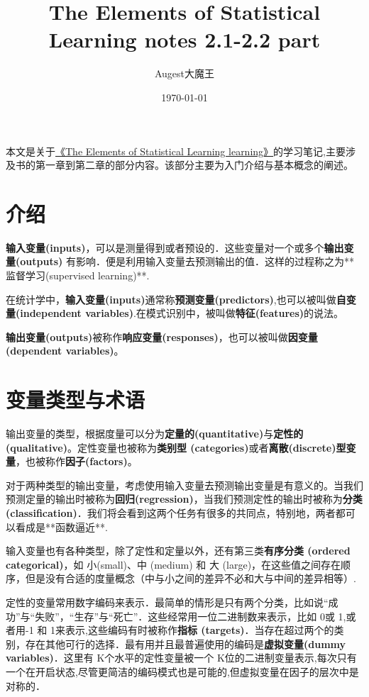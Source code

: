 \documentclass[UTF8]{ctexart}
\title{The Elements of Statistical Learning notes 2.1-2.2 part}
\author{Augest大魔王}
\date{\today}
\begin{document}
  
	\maketitle
	
	本文是关于\href{https://github.com/dr-jiahaoCHEN/Mathematics-and-Statistics/blob/main/book%26notes/The%20Elements%20of%20Statistical%20Learning/(Springer%20Series%20in%20Statistics)%20Trevor%20Hastie%2C%20%20Robert%20Tibshirani%2C%20Jerome%20Friedman%20-%20The%20Elements%20of%20%20Statistical%20Learning_%20%20Data%20Mining%2C%20Inference%2C%20and%20Prediction.-Springer%20(2013).pdf}{《The Elements of Statistical Learning learning》}的学习笔记,主要涉及书的第一章到第二章的部分内容。该部分主要为入门介绍与基本概念的阐述。
	
	\section{介绍}
	\textbf{输入变量(inputs)}，可以是测量得到或者预设的．这些变量对一个或多个\textbf{输出变量(outputs)} 有影响．便是利用输入变量去预测输出的值．这样的过程称之为**监督学习(supervised learning)**.
	
	在统计学中，\textbf{输入变量(inputs)}通常称\textbf{预测变量(predictors)},也可以被叫做\textbf{自变量(independent variables)}.在模式识别中，被叫做\textbf{特征(features)}的说法。
	
	\textbf{输出变量(outputs)}被称作\textbf{响应变量(responses)}，也可以被叫做\textbf{因变量(dependent variables)}。
	
	
	\section{变量类型与术语}
	输出变量的类型，根据度量可以分为\textbf{定量的(quantitative)}与\textbf{定性的(qualitative)}。定性变量也被称为\textbf{类别型 (categories)}或者\textbf{离散(discrete)型变量}，也被称作\textbf{因子(factors)}。
	
	对于两种类型的输出变量，考虑使用输入变量去预测输出变量是有意义的。当我们预测定量的输出时被称为\textbf{回归(regression)}，当我们预测定性的输出时被称为\textbf{分类(classification)}．我们将会看到这两个任务有很多的共同点，特别地，两者都可以看成是**函数逼近**.
	
	输入变量也有各种类型，除了定性和定量以外，还有第三类\textbf{有序分类 (ordered categorical)}，如 小(small)、中 (medium) 和 大 (large)，在这些值之间存在顺序，但是没有合适的度量概念（中与小之间的差异不必和大与中间的差异相等）.
	
	定性的变量常用数字编码来表示．最简单的情形是只有两个分类，比如说“成功”与“失败”，“生存”与“死亡”．这些经常用一位二进制数来表示，比如 0或 1,或者用-1 和 1来表示,这些编码有时被称作\textbf{指标 (targets)}．当存在超过两个的类别，存在其他可行的选择．最有用并且最普遍使用的编码是\textbf{虚拟变量(dummy variables)}．这里有 K个水平的定性变量被一个 K位的二进制变量表示,每次只有一个在开启状态,尽管更简洁的编码模式也是可能的,但虚拟变量在因子的层次中是对称的．
	
\end{document}

